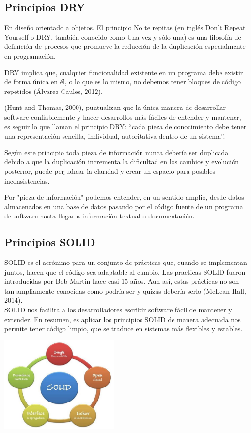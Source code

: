 \documentclass{article}
\begin{document}
\begin{multicols}{2}
\subsection{Principios DRY}
 \quad En diseño orientado a objetos, El principio No te repitas (en inglés Don't Repeat Yourself o DRY, también conocido como Una vez y sólo una) es una filosofía de definición de procesos que promueve la reducción de la duplicación especialmente en programación. 

DRY implica que, cualquier funcionalidad existente en un programa debe existir de forma única en él, o lo que es lo mismo, no debemos tener bloques de código repetidos (Álvarez Caules, 2012). 

(Hunt and Thomas, 2000), puntualizan que la única manera de desarrollar software confiablemente y hacer desarrollos más fáciles de entender y mantener, es seguir lo que llaman el principio DRY: “cada pieza de conocimiento debe tener una representación sencilla, individual, autoritativa dentro de un sistema”.

Según este principio toda pieza de información nunca debería ser duplicada debido a que la duplicación incrementa la dificultad en los cambios y evolución posterior, puede perjudicar la claridad y crear un espacio para posibles inconsistencias.

Por "pieza de información" podemos entender, en un sentido amplio, desde datos almacenados en una base de datos pasando por el código fuente de un programa de software hasta llegar a información textual o documentación.

\subsection{Principios SOLID}
SOLID es el acrónimo para un conjunto de prácticas que, cuando se implementan juntos, hacen que el código sea adaptable al cambio. Las practicas SOLID fueron introducidas por Bob Martin hace casi 15 años. Aun así, estas prácticas no son tan ampliamente conocidas como podría ser y quizás debería serlo (McLean Hall, 
2014). \\ SOLID nos facilita a los desarrolladores escribir software fácil de mantener y extender. En resumen, es aplicar los principios SOLID de manera adecuada nos permite tener código limpio, que se traduce en sistemas más flexibles y estables.
\begin{center}
\includegraphics[width=6cm]{imagenes/principiosSOLID.png}


\end{center}
\end{multicols}
\end{document}

